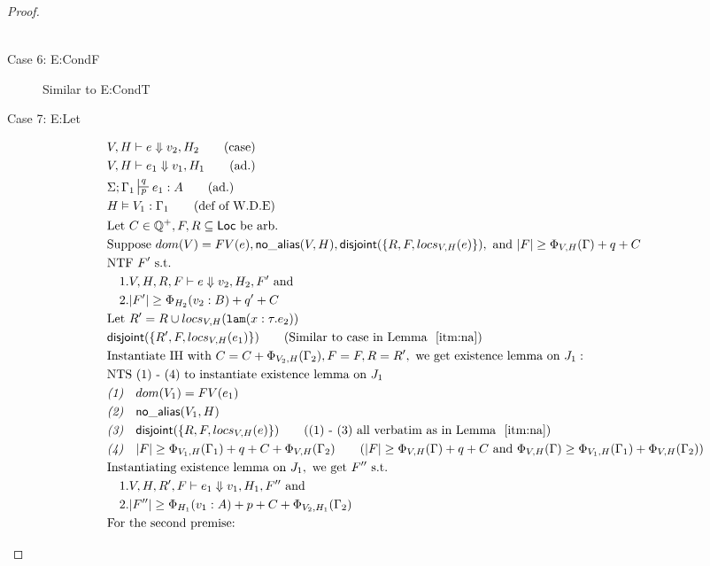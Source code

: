 \documentclass[sigconf]{acmart}
\newcommand{\ms}[1]{\ensuremath{\mathsf{#1}}}
\newcommand{\irl}[1]{\mathtt{#1}}
\newcommand{\na}[1]{\mathsf{no\_alias}(#1)}
\newcommand{\dist}[1]{\mathsf{disjoint}(#1)}
\theoremstyle{definition}
\begin{document}
\begin{proof}
\begin{description}
\begin{align*}
  \end{align*}
  \item[Case 6: E:CondF] 
  Similar to E:CondT
  \item[Case 7: E:Let]
  \begin{align*}
  &V,H \vdash e \Downarrow v_2,H_2 \tag{case}\\
  &V,H \vdash e_1 \Downarrow v_1,H_1 \tag{ad.}\\
  &\Sigma; \Gamma_1 \sststile{p}{q} e_1 : A \tag{ad.}\\
  &H \vDash V_1 : \Gamma_1 \tag{def of W.D.E}\\
  &\text{Let } C \in \mathbb{Q}^+, F,R \subseteq \ms{Loc} \text{ be arb.}\\
  &\text{Suppose }  dom(V) = FV(e),\na{V,H}, \dist{\{R,F,locs_{V,H}(e)\}}, \text{ and } |F| \ge \Phi_{V,H}(\Gamma) + q + C\\
  &\text{NTF } F' \text{ s.t. }\\
  &\quad 1. V,H,R,F \vdash e \Downarrow v_2, H_2,F' \text{ and }\\ 
  &\quad 2. |F'| \ge \Phi_{H_2}(v_2:B) + q' + C\\
  &\text{Let } R' = R \cup locs_{V,H}(\irl{lam}(x : \tau.e_2))\\
  &\dist{\{R',F,locs_{V,H}(e_1)\}} \tag{Similar to case in Lemma $~\ref{itm:na}$}\\
  &\text{Instantiate IH with } C = C + \Phi_{V_2,H}(\Gamma_2), F = F, R = R', \text{ we get existence lemma on } J_1:\\
  &\text{NTS (1) - (4) to instantiate existence lemma on } J_1\\
  &\emph{(1)} \quad dom(V_1) = FV(e_1)\\
  &\emph{(2)} \quad \na{V_1,H}\\
  &\emph{(3)} \quad \dist{\{R,F,locs_{V,H}(e)\}} \tag{(1) - (3) all verbatim as in Lemma $~\ref{itm:na}$}\\
  &\emph{(4)} \quad |F| \ge \Phi_{V_1,H}(\Gamma_1) + q + C + \Phi_{V,H}(\Gamma_2) \tag{$|F| \ge \Phi_{V,H}(\Gamma) + q + C$ and $\Phi_{V,H}(\Gamma) \ge \Phi_{V_1,H}(\Gamma_1) + \Phi_{V,H}(\Gamma_2)$}\\
  &\text{Instantiating existence lemma on } J_1, \text{ we get }  F'' \text{ s.t. }\\
  &\quad 1. V,H,R',F \vdash e_1 \Downarrow v_1, H_1,F'' \text{ and }\\ 
  &\quad 2. |F''| \ge \Phi_{H_1}(v_1:A) + p + C + \Phi_{V_2,H_1}(\Gamma_2)\\
  &\text{For the second premise: }\\

\end{align*}
\end{description}
\end{proof}
\end{document}
